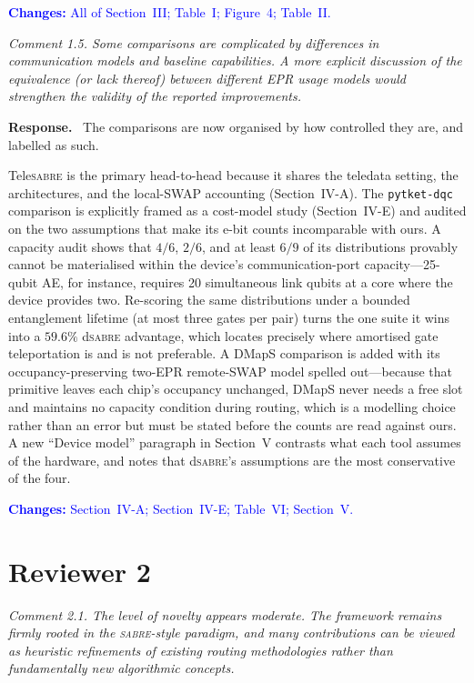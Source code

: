 \documentclass[11pt]{article}
\newcommand{\dSABRE}{d\textsc{sabre}}
\newcommand{\TeleSABRE}{Tele\textsc{sabre}}
\newcommand{\SABRE}{\textsc{sabre}}
\newenvironment{comment}{\medskip\noindent\itshape}{\par}
\newcommand{\response}{\smallskip\noindent\textbf{Response.}\ }
\newcommand{\where}[1]{\textcolor{blue}{\textbf{Changes:} #1}}
\begin{document}
\where{All of Section~III; Table~I; Figure~4; Table~II.}

\begin{comment}
Comment 1.5. Some comparisons are complicated by differences in communication
models and baseline capabilities. A more explicit discussion of the
equivalence (or lack thereof) between different EPR usage models would
strengthen the validity of the reported improvements.
\end{comment}

\response
The comparisons are now organised by how controlled they are, and labelled as
such.

\TeleSABRE{} is the primary head-to-head because it shares the teledata
setting, the architectures, and the local-SWAP accounting (Section~IV-A). The
\texttt{pytket-dqc} comparison is explicitly framed as a cost-model study
(Section~IV-E) and audited on the two assumptions that make its e-bit counts
incomparable with ours. A capacity audit shows that $4/6$, $2/6$, and at least
$6/9$ of its distributions provably cannot be materialised within the
device's communication-port capacity---25-qubit AE, for instance, requires 20
simultaneous link qubits at a core where the device provides two. Re-scoring
the same distributions under a bounded entanglement lifetime (at most three
gates per pair) turns the one suite it wins into a $59.6\%$ \dSABRE{}
advantage, which locates precisely where amortised gate teleportation is and
is not preferable. A DMapS comparison is added with its occupancy-preserving
two-EPR remote-SWAP model spelled out---because that primitive leaves each
chip's occupancy unchanged, DMapS never needs a free slot and maintains no
capacity condition during routing, which is a modelling choice rather than an
error but must be stated before the counts are read against ours. A new
``Device model'' paragraph in Section~V contrasts what each tool assumes of
the hardware, and notes that \dSABRE{}'s assumptions are the most conservative
of the four.

\where{Section~IV-A; Section~IV-E; Table~VI; Section~V.}

\section*{Reviewer 2}

\begin{comment}
Comment 2.1. The level of novelty appears moderate. The framework remains
firmly rooted in the \SABRE{}-style paradigm, and many contributions can be
viewed as heuristic refinements of existing routing methodologies rather than
fundamentally new algorithmic concepts.
\end{comment}
\end{document}
